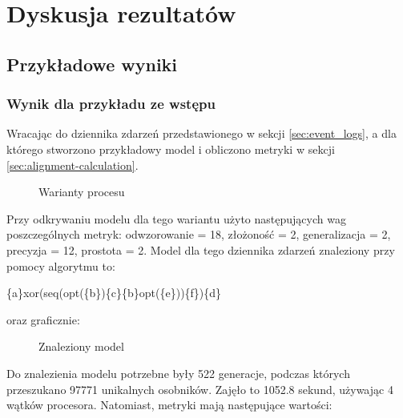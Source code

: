 \chapter{Dyskusja rezultatów}

\section{Przykładowe wyniki}
\subsection{Wynik dla przykładu ze wstępu}
Wracając do dziennika zdarzeń przedstawionego w sekcji \ref{sec:event_logs}, a dla którego stworzono przykładowy model i obliczono metryki w sekcji \ref{sec:alignment-calculation}. 
\begin{figure}[!ht]
	\caption{\label{fig:flow_chart}Warianty procesu}
\end{figure}

Przy odkrywaniu modelu dla tego wariantu użyto następujących wag poszczególnych metryk: odwzorowanie = 18, złożoność = 2, generalizacja = 2, precyzja = 12, prostota = 2. Model dla tego dziennika zdarzeń znaleziony przy pomocy algorytmu to:
\begin{center}
	\{a\}xor(seq(opt(\{b\})\{c\}\{b\}opt(\{e\}))\{f\})\{d\}
\end{center}
oraz graficznie:

\begin{figure}[!ht]
	\caption{\label{fig:flow_chart}Znaleziony model}
\end{figure}

Do znalezienia modelu potrzebne były 522 generacje, podczas których przeszukano 97771 unikalnych osobników. Zajęło to 1052.8 sekund, używając 4 wątków procesora. Natomiast, metryki mają następujące wartości: 

